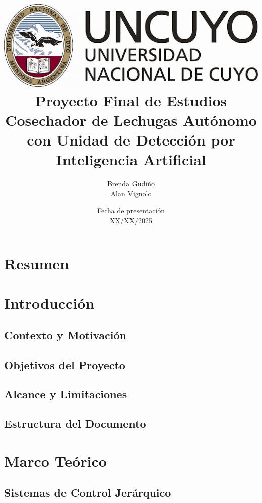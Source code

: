 \documentclass[a4paper,12pt]{report}
\title{
\includegraphics[scale = 0.3]{logo_uncuyo.png} \\ [2cm]
{\Huge \textbf{Proyecto Final de Estudios} \\ [1cm] 
Cosechador de Lechugas Autónomo con Unidad de Detección por Inteligencia Artificial}}
\author{Brenda Gudiño \\ Alan Vignolo}
\date{Fecha de presentación \\ XX/XX/2025}
\begin{document}
\maketitle
\tableofcontents
\newpage

\chapter*{Resumen}


\chapter{Introducción}

\section{Contexto y Motivación}


\section{Objetivos del Proyecto}


\section{Alcance y Limitaciones}


\section{Estructura del Documento}


\chapter{Marco Teórico}

\section{Sistemas de Control Jerárquico}




\end{document}
